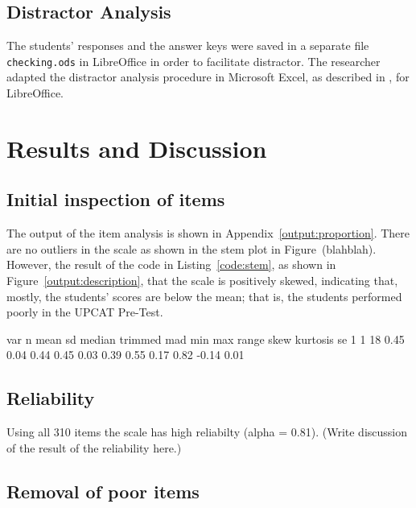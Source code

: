 \documentclass[10pt,man]{apa6}\usepackage{graphicx, color}
\begin{document}
\subsection{Distractor Analysis}

The students' responses and the answer keys were saved in a separate file \texttt{checking.ods} in LibreOffice in order to facilitate distractor. The researcher adapted the distractor analysis procedure in Microsoft Excel, as described in \textcite{elvin}, for LibreOffice. 

\section{Results and Discussion}
\subsection{Initial inspection of items}
The output of the item analysis is shown in Appendix~\ref{output:proportion}. There are no outliers in the scale as shown in the stem plot in Figure~(blahblah). However, the result of the code in Listing~\ref{code:stem}, as shown in Figure~\ref{output:description}, that the scale is positively skewed, indicating that, mostly, the students' scores are below the mean; that is, the students performed poorly in the UPCAT Pre-Test.

\begin{center}
\begin{Schunk}
\begin{Soutput}
  var  n mean   sd median trimmed  mad  min  max range skew kurtosis   se
1   1 18 0.45 0.04   0.44    0.45 0.03 0.39 0.55  0.17 0.82    -0.14 0.01
\end{Soutput}
\end{Schunk}

\end{center}

\subsection{Reliability}

Using all 310 items the scale has high reliabilty
(alpha = 0.81). (Write discussion of the result of the reliability here.)

\subsection{Removal of poor items}
\end{document}
